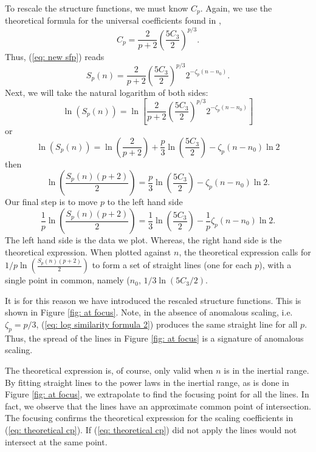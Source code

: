 To rescale the structure functions, we must know $C_{p}$.  Again, we use the theoretical formula for the universal coefficients found in \cite{Melander2007},
\begin{equation}
    C_{p} = \frac{2}{p+2}\left(\frac{5C_{3}}{2}\right)^{p/3}. \label{eq: theoretical cp}
\end{equation}
Thus,  (\ref{eq: new sfp}) reads
\begin{equation}
    S_{p}(n)  =  \frac{2}{p+2}\left(\frac{5C_{3}}{2}\right)^{p/3}2^{-\zeta_{p}(n-n_{0})} . \label{eq: sfp with theoretical cp}
\end{equation}
Next, we will take the natural logarithm of both sides:
\begin{equation}
    \ln\left(S_{p}(n)\right) = \ln\left[\frac{2}{p+2}\left(\frac{5C_{3}}{2}\right)^{p/3}2^{-\zeta_{p}(n-n_{0})}\right]
\end{equation}
or
\begin{equation}
    \ln\left(S_{p}(n)\right) = \ln\left(\frac{2}{p+2}\right) + \frac{p}{3}\ln\left(\frac{5C_{3}}{2}\right) -\zeta_{p}(n-n_{0})\ln2
\end{equation}
then
\begin{equation}
    \ln\left(\frac{S_{p}(n)(p+2)}{2}\right) = \frac{p}{3}\ln\left(\frac{5C_{3}}{2}\right) -\zeta_{p}(n-n_{0})\ln2.
\end{equation}
Our final step is to move $p$ to the left hand side
\begin{equation}
    \frac{1}{p}\ln\left(\frac{S_{p}(n)(p+2)}{2}\right) = \frac{1}{3}\ln\left(\frac{5C_{3}}{2}\right) -\frac{1}{p}\zeta_{p}(n-n_{0})\ln2 .\label{eq: log similarity formula 2}
\end{equation}
The left hand side is the data we plot. Whereas, the right hand side is the theoretical expression. When plotted against $n$, the theoretical expression calls for $1/p\ln\left(\frac{S_{p}(n)(p+2)}{2}\right)$ to form a set of straight lines (one for each $p$), with a single point in common, namely ($n_0$, $1/3\ln\left(5C_3/2\right)$.

It is for this reason we have introduced the rescaled structure functions.  This is shown in Figure \ref{fig: at focus}. Note, in the absence of anomalous scaling, i.e. $\zeta_p = p/3$, (\ref{eq: log similarity formula 2}) produces the same straight line for all $p$.  Thus, the spread of the lines in Figure \ref{fig: at focus} is a signature of anomalous scaling.

The theoretical expression is, of course, only valid when $n$ is in the inertial range.  By fitting straight lines to the power laws in the inertial range, as is done in Figure \ref{fig: at focus}, we extrapolate to find the focusing point for all the lines.  In fact, we observe that the lines have an approximate common point of intersection.  The focusing confirms the theoretical expression for the scaling coefficients in (\ref{eq: theoretical cp}). If (\ref{eq: theoretical cp}) did not apply the lines would not intersect at the same point.

